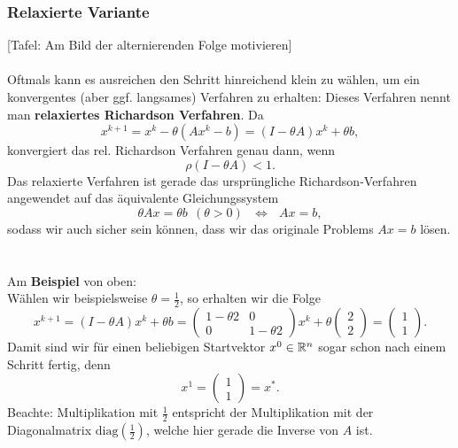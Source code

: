 \subsubsection{Relaxierte Variante}
[Tafel: Am Bild der alternierenden Folge motivieren]\\~\\
Oftmals kann es ausreichen den Schritt hinreichend klein zu wählen, um ein konvergentes (aber ggf. langsames) Verfahren zu erhalten:
Dieses Verfahren nennt man \textbf{relaxiertes Richardson Verfahren}.
Da $$x^{k+1} = x^k - \theta(Ax^k - b) = (I-\theta A)x^k + \theta b,$$ konvergiert das rel. Richardson Verfahren genau dann, wenn $$\rho(I-\theta A) < 1. $$
Das relaxierte Verfahren ist gerade das ursprüngliche Richardson-Verfahren angewendet auf das äquivalente Gleichungssystem
$$\theta Ax = \theta b~~(\theta > 0 ) ~~~\Leftrightarrow~~~Ax = b,$$
sodass wir auch sicher sein können, dass wir das originale Problems $Ax=b$ lösen.
~\\~\\
Am \textbf{Beispiel} von oben:\\
Wählen wir beispielsweise $\theta = \frac{1}{2}$, so erhalten wir die Folge
$$x^{k+1} = (I-\theta A)x^k + \theta b = \begin{pmatrix}1-\theta 2&0\\0&1-\theta 2\end{pmatrix}x^k + \theta\begin{pmatrix}2\\2\end{pmatrix} = \begin{pmatrix}1\\1\end{pmatrix}. $$
Damit sind wir für einen beliebigen Startvektor $x^0\in{\mathbb{R}}^{n}$ sogar schon nach einem Schritt fertig, denn
$$x^1 =  \begin{pmatrix}1\\1\end{pmatrix}  = x^*. $$
Beachte: Multiplikation mit $\frac{1}{2}$ entspricht der Multiplikation mit der Diagonalmatrix $\text{diag}(\frac{1}{2})$, welche hier gerade die Inverse von $A$ ist. \\

